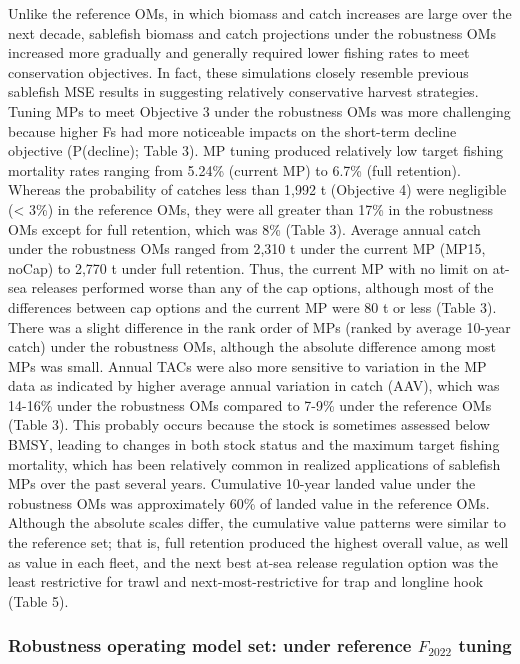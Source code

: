 \documentclass[11pt]{book}
\begin{document}
Unlike the reference OMs, in which biomass and catch increases are large over the next decade, sablefish biomass and catch projections under the robustness OMs increased more gradually and generally required lower fishing rates to meet conservation objectives. In fact, these simulations closely resemble previous sablefish MSE results in suggesting relatively conservative harvest strategies. Tuning MPs to meet Objective 3 under the robustness OMs was more challenging because higher Fs had more noticeable impacts on the short-term decline objective (P(decline); Table 3). MP tuning produced relatively low target fishing mortality rates ranging from 5.24\% (current MP) to 6.7\% (full retention). Whereas the probability of catches less than 1,992 t (Objective 4) were negligible (\textless{} 3\%) in the reference OMs, they were all greater than 17\% in the robustness OMs except for full retention, which was 8\% (Table 3). Average annual catch under the robustness OMs ranged from 2,310 t under the current MP (MP15, noCap) to 2,770 t under full retention. Thus, the current MP with no limit on at-sea releases performed worse than any of the cap options, although most of the differences between cap options and the current MP were 80 t or less (Table 3). There was a slight difference in the rank order of MPs (ranked by average 10-year catch) under the robustness OMs, although the absolute difference among most MPs was small. Annual TACs were also more sensitive to variation in the MP data as indicated by higher average annual variation in catch (AAV), which was 14-16\% under the robustness OMs compared to 7-9\% under the reference OMs (Table 3). This probably occurs because the stock is sometimes assessed below BMSY, leading to changes in both stock status and the maximum target fishing mortality, which has been relatively common in realized applications of sablefish MPs over the past several years. Cumulative 10-year landed value under the robustness OMs was approximately 60\% of landed value in the reference OMs. Although the absolute scales differ, the cumulative value patterns were similar to the reference set; that is, full retention produced the highest overall value, as well as value in each fleet, and the next best at-sea release regulation option was the least restrictive for trawl and next-most-restrictive for trap and longline hook (Table 5).

\hypertarget{robustness-operating-model-set-under-reference-f_2022-tuning}{%
\subsubsection{\texorpdfstring{Robustness operating model set: under reference \(F_{2022}\) tuning}{Robustness operating model set: under reference F\_\{2022\} tuning}}\label{robustness-operating-model-set-under-reference-f_2022-tuning}}
\end{document}
